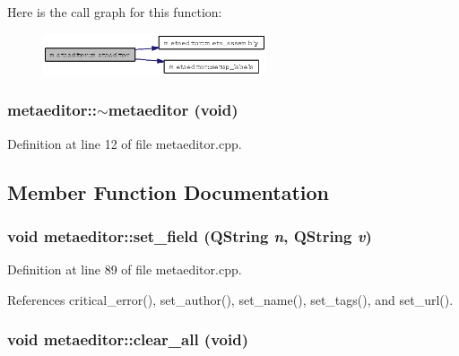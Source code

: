 Here is the call graph for this function:\begin{figure}[H]
\begin{center}
\leavevmode
\includegraphics[width=187pt]{classmetaeditor_e9fe78e661a20bfc001ac7bab2f2a811_cgraph}
\end{center}
\end{figure}
\subsubsection{\setlength{\rightskip}{0pt plus 5cm}metaeditor::$\sim$metaeditor (void)}\label{classmetaeditor_0e62ac6c02393e286337405f6e6fcd69}




Definition at line 12 of file metaeditor.cpp.

\subsection{Member Function Documentation}
\subsubsection{\setlength{\rightskip}{0pt plus 5cm}void metaeditor::set\_\-field (QString {\em n}, QString {\em v})\hspace{0.3cm}{\tt  [slot]}}\label{classmetaeditor_ba00bde8cb316ab60bfcb19c2fe48bae}




Definition at line 89 of file metaeditor.cpp.

References critical\_\-error(), set\_\-author(), set\_\-name(), set\_\-tags(), and set\_\-url().
\subsubsection{\setlength{\rightskip}{0pt plus 5cm}void metaeditor::clear\_\-all (void)\hspace{0.3cm}{\tt  [slot]}}\label{classmetaeditor_dd639c71a9b0963c7ace5b6ec55ceebd}




